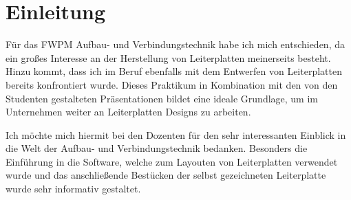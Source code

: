 
\section*{Einleitung}
Für das FWPM Aufbau- und Verbindungstechnik habe ich mich entschieden, da ein großes Interesse an der Herstellung von Leiterplatten meinerseits besteht. Hinzu kommt, dass ich im Beruf ebenfalls mit dem Entwerfen von Leiterplatten bereits konfrontiert wurde. Dieses Praktikum in Kombination mit den von den Studenten gestalteten Präsentationen bildet eine ideale Grundlage, um im Unternehmen weiter an Leiterplatten Designs zu arbeiten.

Ich möchte mich hiermit bei den Dozenten für den sehr interessanten Einblick in die Welt der Aufbau- und Verbindungstechnik bedanken. Besonders die Einführung in die Software, welche zum Layouten von Leiterplatten verwendet wurde und das anschließende Bestücken der selbst gezeichneten Leiterplatte wurde sehr informativ gestaltet.
